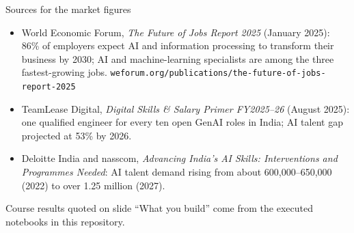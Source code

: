 \documentclass[aspectratio=169,11pt,xcolor=table]{beamer}
\begin{document}
\begin{frame}{Sources for the market figures}
\small
\begin{itemize}
\item World Economic Forum, \emph{The Future of Jobs Report 2025} (January 2025): 86\% of employers expect AI and information processing to transform their business by 2030; AI and machine-learning specialists are among the three fastest-growing jobs. \texttt{weforum.org/publications/the-future-of-jobs-report-2025}
\item TeamLease Digital, \emph{Digital Skills \& Salary Primer FY2025--26} (August 2025): one qualified engineer for every ten open GenAI roles in India; AI talent gap projected at 53\% by 2026.
\item Deloitte India and nasscom, \emph{Advancing India's AI Skills: Interventions and Programmes Needed}: AI talent demand rising from about 600,000--650,000 (2022) to over 1.25 million (2027).
\end{itemize}
\vspace{6pt}
\footnotesize Course results quoted on slide ``What you build'' come from the executed notebooks in this repository.
\end{frame}
\end{document}

